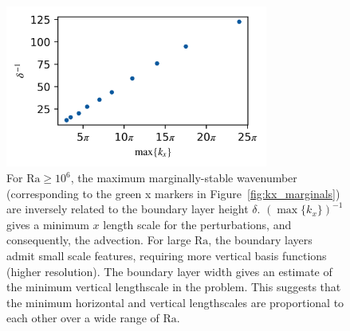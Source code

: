 \documentclass[reprint,amsmath,amssymb,aps]{revtex4-1}
\newcommand\Ra{\mathrm{Ra}}
\begin{document}
\begin{figure}
    \centering
    \includegraphics[width=3.4in]{del_kx_inv.png}
    \caption{For $\Ra \geq 10^6$, the maximum marginally-stable wavenumber (corresponding to the green x markers in Figure~\ref{fig:kx_marginals}) are inversely related to the boundary layer height $\delta$. 
    $(\max \{ k_x \})^{-1}$ gives a minimum $x$ length scale for the perturbations, and consequently, the advection. 
    For large $\Ra$, the boundary layers admit small scale features, requiring more vertical basis functions (higher resolution).
    The boundary layer width gives an estimate of the minimum vertical lengthscale in the problem.
    This suggests that the minimum horizontal and vertical lengthscales are proportional to each other over a wide range of $\Ra$.}
    \label{fig:del_inv}
\end{figure}
\end{document}
